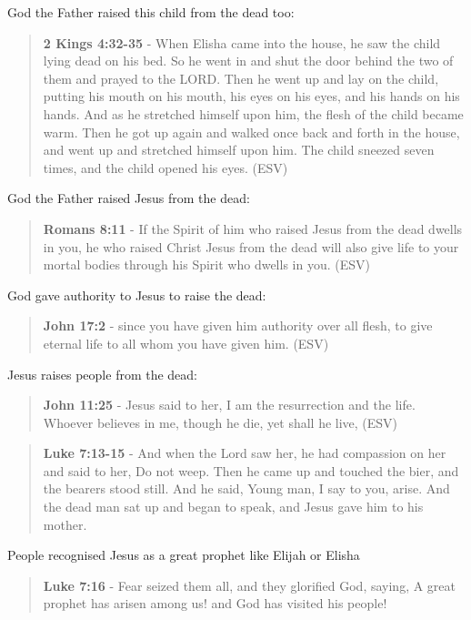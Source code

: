 \documentclass[11pt]{article}
\begin{document}
God the Father raised this child from the dead too:

\begin{quote}
\textbf{2 Kings 4:32-35} -  When Elisha came into the house, he saw the child lying dead on his bed.  So he went in and shut the door behind the two of them and prayed to the LORD.  Then he went up and lay on the child, putting his mouth on his mouth, his eyes on his eyes, and his hands on his hands.  And as he stretched himself upon him, the flesh of the child became warm.  Then he got up again and walked once back and forth in the house, and went up and stretched himself upon him. The child sneezed seven times, and the child opened his eyes.  (ESV)
\end{quote}

God the Father raised Jesus from the dead:

\begin{quote}
\textbf{Romans 8:11} - If the Spirit of him who raised Jesus from the dead dwells in you, he who raised Christ Jesus from the dead will also give life to your mortal bodies through his Spirit who dwells in you. (ESV)
\end{quote}

God gave authority to Jesus to raise the dead:

\begin{quote}
\textbf{John 17:2} - since you have given him authority over all flesh, to give eternal life to all whom you have given him. (ESV)
\end{quote}

Jesus raises people from the dead:

\begin{quote}
\textbf{John 11:25} - Jesus said to her, I am the resurrection and the life. Whoever believes in me, though he die, yet shall he live, (ESV)
\end{quote}

\begin{quote}
\textbf{Luke 7:13-15} - And when the Lord saw her, he had compassion on her and said to her, Do not weep. Then he came up and touched the bier, and the bearers stood still. And he said, Young man, I say to you, arise. And the dead man sat up and began to speak, and Jesus gave him to his mother.
\end{quote}

People recognised Jesus as a great prophet like Elijah or Elisha

\begin{quote}
\textbf{Luke 7:16} - Fear seized them all, and they glorified God, saying, A great prophet has arisen among us! and God has visited his people!
\end{quote}
\end{document}
